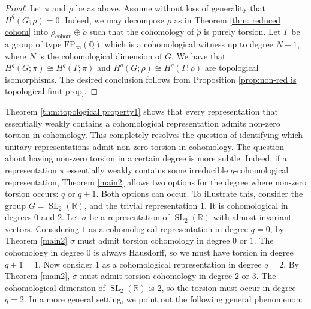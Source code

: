 \documentclass[12pt,reqno]{amsart}
\newcommand{\Q}{\mathbb{Q}}
\newcommand{\R}{\mathbb{R}}
\theoremstyle{definition}
\newcommand{\SL}{\operatorname{SL}}
\begin{document}
\begin{proof}
    Let $\pi$ and $\rho$ be as above. Assume without loss of generality that $\bar{H}^q(G;\rho)=0$. Indeed, we may decompose $\rho$ as in Theorem \ref{thm: reduced cohom} into $\rho_\mathrm{cohom} \oplus \mathring{\rho}$ such that the cohomology of $\mathring{\rho}$ is purely torsion. Let $\Gamma$ be a group of type $\mathrm{FP}_\infty(\Q)$ which is a cohomological witness up to degree $N+1$, where $N$ is the cohomological dimension of $G$. We have that $H^q(G;\pi) \cong H^q(\Gamma;\pi)$ and $H^q(G;\rho) \cong H^q(\Gamma;\rho)$ are topological isomorphisms. The desired conclusion follows from Proposition \ref{prop:non-red is topological finit prop}.
\end{proof}

Theorem \ref{thm:topological property1} shows that every representation that essentially weakly contains a cohomological representation admits non-zero torsion in cohomology. This completely resolves the question of identifying which unitary representations admit non-zero torsion in cohomology. The question about having non-zero torsion in a certain degree is more subtle. Indeed, if a representation $\pi$ essentially weakly contains some irreducible $q$-cohomological representation, Theorem \ref{main2} allows two options for the degree where non-zero torsion occurs: $q$ or $q+1$. Both options can occur. To illustrate this, consider the group $G=\SL_2(\R)$, and the trivial representation $1$. It is cohomological in degrees $0$ and $2$. Let $\sigma$ be a representation of $\SL_2(\R)$ with almost invariant vectors. Considering $1$ as a cohomological representation in degree $q=0$, by Theorem \ref{main2} $\sigma$ must admit torsion cohomology in degree $0$ or $1$. The cohomology in degree $0$ is always Hausdorff, so we must have torsion in degree $q+1 = 1$. Now consider $1$ as a cohomological representation in degree $q=2$. By Theorem \ref{main2}, $\sigma$ must admit torsion cohomology in degree $2$ or $3$. The cohomological dimension of $\SL_2(\R)$ is $2$, so the torsion must occur in degree $q=2$. In  a more general setting, we point out the following general phenomenon: 
\end{document}
